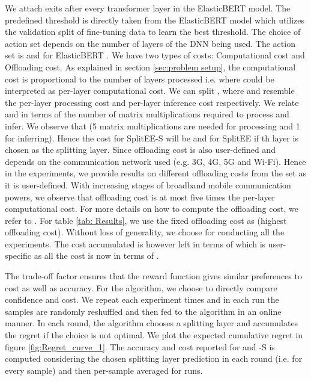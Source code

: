We attach exits after every transformer layer in the ElasticBERT model. The predefined threshold  is directly taken from the ElasticBERT model which utilizes the validation split of fine-tuning data to learn the best threshold. The choice of action set depends on the number of layers of the DNN being used. The action set is  and for ElasticBERT . 
We have two types of costs: Computational cost and Offloading cost. As explained in section \ref{sec:problem setup}, the computational cost is proportional to the number of layers processed i.e.  where  could be interpreted as per-layer computational cost. We can split , where  and  resemble the per-layer processing cost and per-layer inference cost respectively. We relate  and  in terms of the number of matrix multiplications required to process and infer. We observe that  (5 matrix multiplications are needed for processing and 1 for inferring). Hence the cost for SplitEE-S will be  and  for SplitEE if th layer is chosen as the splitting layer.
Since offloading cost is also user-defined and depends on the communication network used (e.g. 3G, 4G, 5G and Wi-Fi). Hence in the experiments, we provide results on different offloading costs  from the set  as it is user-defined. With increasing stages of broadband mobile communication powers, we observe that offloading cost is at most five times the per-layer computational cost. For more details on how to compute the offloading cost, we refer to \cite{kuang2019partial}. For table \ref{tab: Results}, we use the fixed offloading cost as  (highest offloading cost). Without loss of generality, we choose  for conducting all the experiments. The cost accumulated is however left in terms of  which is user-specific as all the cost is now in terms of .




The trade-off factor  ensures that the reward function gives similar preferences to cost as well as accuracy. For the algorithm, we choose  to directly compare confidence and cost.
We repeat each experiment  times and in each run the samples are randomly reshuffled and then fed to the algorithm in an online manner. In each round, the algorithm chooses a splitting layer and accumulates the regret if the choice is not optimal. We plot the expected cumulative regret in figure \ref{fig:Regret_curve_1}. The accuracy and cost reported for \our{} and \our{}-S is computed considering the chosen splitting layer prediction in each round (i.e. for every sample) and then per-sample averaged for  runs.



